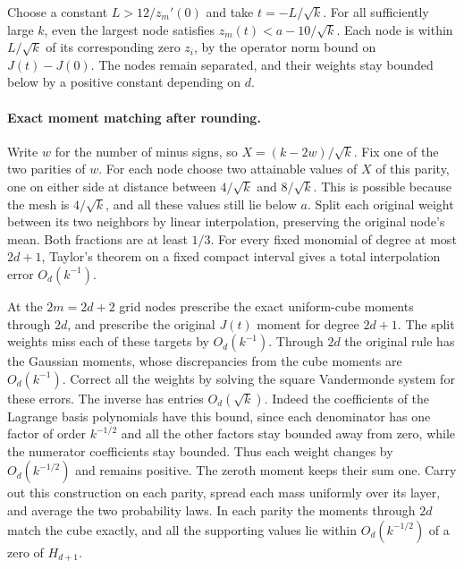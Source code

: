 Choose a constant $L>12/z_m'(0)$ and take $t=-L/\sqrt{k}$.
For all sufficiently large $k$, even the largest node satisfies
$z_m(t)<a-10/\sqrt{k}$. Each node is within $L/\sqrt{k}$ of its
corresponding zero $z_i$, by the operator norm bound on $J(t)-J(0)$.
The nodes remain separated, and their weights stay bounded below by a
positive constant depending on $d$.

\clearpage
\paragraph{Exact moment matching after rounding.}
Write $w$ for the number of minus signs, so $X=(k-2w)/\sqrt{k}$.
Fix one of the two parities of $w$. For each node choose two attainable
values of $X$ of this parity, one on either side at distance between
$4/\sqrt{k}$ and $8/\sqrt{k}$. This is possible because the mesh is
$4/\sqrt{k}$, and all these values still lie below $a$. Split each
original weight between its two neighbors by linear interpolation,
preserving the original node's mean. Both fractions are at least $1/3$.
For every fixed monomial of degree at most $2d+1$, Taylor's theorem on a
fixed compact interval gives a total interpolation error $O_d(k^{-1})$.

At the $2m=2d+2$ grid nodes prescribe the exact uniform-cube moments through
$2d$, and prescribe the original $J(t)$ moment for degree $2d+1$. The
split weights miss each of these targets by $O_d(k^{-1})$. Through $2d$
the original rule has the Gaussian moments, whose discrepancies from the
cube moments are $O_d(k^{-1})$. Correct all the weights by solving the
square Vandermonde system for these errors. The inverse has entries
$O_d(\sqrt{k})$. Indeed the coefficients of the Lagrange basis polynomials
have this bound, since each denominator has one factor of order
$k^{-1/2}$ and all the other factors stay bounded away from zero, while the
numerator coefficients stay bounded. Thus each weight changes by
$O_d(k^{-1/2})$ and remains positive. The zeroth moment keeps their sum one.
Carry out this construction on each parity, spread each mass uniformly over
its layer, and average the two probability laws. In each parity the moments
through $2d$ match the cube exactly, and all the supporting values lie
within $O_d(k^{-1/2})$ of a zero of $H_{d+1}$.

